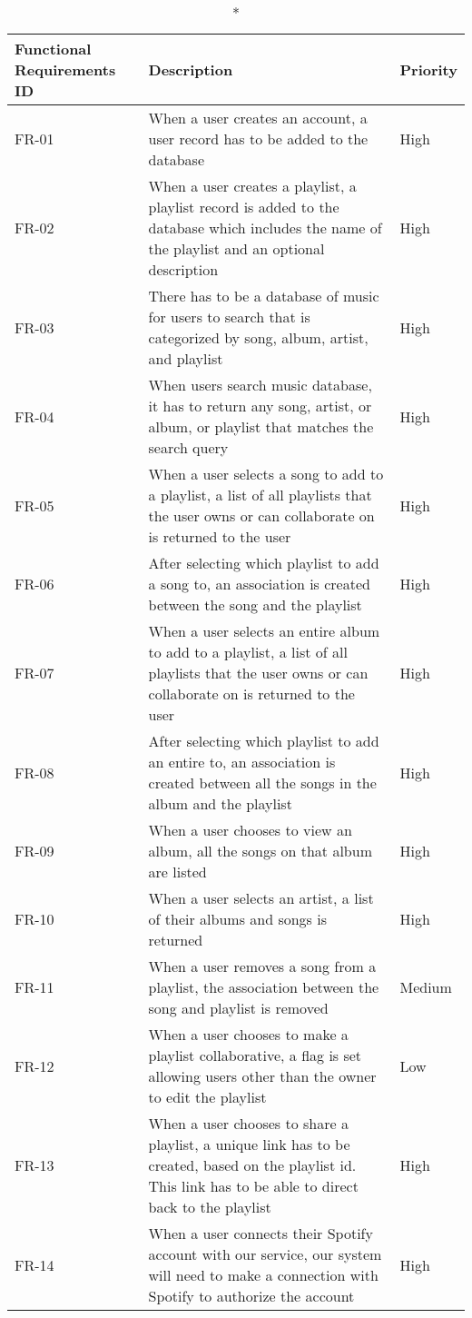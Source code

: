 \begin{longtable}{lXl}
			\caption*{Functional Requirements}
			\endfirsthead
			\endhead
			ID & Description & Priority \\\hline
			FR-01 & When a user creates an account, a user record has to be added to the database & High \\
			FR-02 & When a user creates a playlist, a playlist record is added to the database which includes the name of the playlist and an optional description & High \\
			FR-03 & There has to be a database of music for users to search that is categorized by song, album, artist, and playlist & High \\
			FR-04 & When users search music database, it has to return any song, artist, or album, or playlist that matches the search query & High \\
			FR-05 & When a user selects a song to add to a playlist, a list of all playlists that the user owns or can collaborate on is returned to the user & High \\
			FR-06 & After selecting which playlist to add a song to, an association is created between the song and the playlist & High \\
			FR-07 & When a user selects an entire album to add to a playlist, a list of all playlists that the user owns or can collaborate on is returned to the user & High \\
			FR-08 & After selecting which playlist to add an entire to, an association is created between all the songs in the album and the playlist & High \\
			FR-09 & When a user chooses to view an album, all the songs on that album are listed & High \\
			FR-10 & When a user selects an artist, a list of their albums and songs is returned & High \\
			FR-11 & When a user removes a song from a playlist, the association between the song and playlist is removed & Medium \\
			FR-12 & When a user chooses to make a playlist collaborative, a flag is set allowing users other than the owner to edit the playlist & Low \\
			FR-13 & When a user chooses to share a playlist, a unique link has to be created, based on the playlist id. This link has to be able to direct back to the playlist & High \\
			FR-14 & When a user connects their Spotify account with our service, our system will need to make a connection with Spotify to authorize the account & High \\

\end{longtable}
